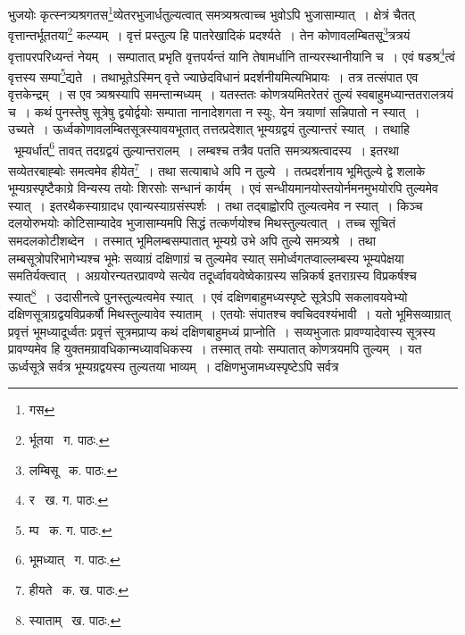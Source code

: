 \documentclass[11pt, openany]{book}
\begin{document}
\newpage
\noindent भुजयोः कृत्स्नत्र्यश्रगतस\renewcommand{\thefootnote}{१}\footnote{गस}व्येतरभुजार्धतुल्यत्वात् समत्र्यश्रत्वाच्च भुवोऽपि भुजासाम्यात्~। क्षेत्रं चैतत् वृत्तान्तर्भूततया\renewcommand{\thefootnote}{२}\footnote{र्भूतया \textendash\ ग. पाठः.} कल्प्यम्~। वृत्तं प्रस्तुत्य हि पातरेखादिकं प्रदर्श्यते~। तेन कोणावलम्बितसू\renewcommand{\thefootnote}{३}\footnote{लम्बिसू \textendash\ क. पाठः.}त्रत्रयं वृत्तापरपरिध्यन्तं नेयम्~। सम्पातात् प्रभृति वृत्तपर्यन्तं यानि तेषामर्धानि तान्यरस्थानीयानि च~। एवं षडश्र\renewcommand{\thefootnote}{४}\footnote{र \textendash\ ख. ग. पाठः.}त्वं वृत्तस्य सम्पा\renewcommand{\thefootnote}{५}\footnote{म्प \textendash\ क. ग. पाठः.}द्यते~। तथाभूतेऽस्मिन् वृत्ते ज्याछेदविधानं प्रदर्शनीयमित्यभिप्रायः~। तत्र तत्संपात एव वृत्तकेन्द्रम्~। स एव त्र्यश्रस्यापि समन्तान्मध्यम्~। यतस्ततः कोणत्रयमितरेतरं तुल्यं स्वबाहुमध्यान्ततरालत्रयं च~। कथं पुनस्तेषु सूत्रेषु द्वयोर्द्वयोः सम्पाता नानादेशगता न स्युः, येन त्रयाणां सन्निपातो न स्यात्~। उच्यते~। ऊर्ध्वकोणावलम्बितसूत्रस्यावयभूतात् तत्तत्प्रदेशात् भूम्यग्रद्वयं तुल्यान्तरं स्यात्~। तथाहि \textendash\ भूम्यर्धात्\renewcommand{\thefootnote}{६}\footnote{भूमध्यात् \textendash\ ग. पाठः.} तावत् तदग्रद्वयं तुल्यान्तरालम्~। लम्बश्च तत्रैव पतति समत्र्यश्रत्वादस्य~। इतरथा सव्येतरबाह्बोः समत्वमेव हीयेत\renewcommand{\thefootnote}{७}\footnote{हीयते \textendash\ क. ख. पाठः.}~। तथा सत्याबाधे अपि न तुल्ये~। तत्प्रदर्शनाय भूमितुल्ये द्वे शलाके भूम्यग्रस्पृष्टैकाग्रे विन्यस्य तयोः शिरसोः सन्धानं कार्यम्~। एवं सन्धीयमानयोस्तयोर्नमनमुभयोरपि तुल्यमेव स्यात्~। इतरथैकस्याग्रादध एवान्यस्याग्रसंस्पर्शः~। तथा तद्बाह्वोरपि तुल्यत्वमेव न स्यात्~। किञ्च दलयोरुभयोः कोटिसाम्यादेव भुजासाम्यमपि सिद्धं तत्कर्णयोश्च मिथस्तुल्यत्वात्~। तच्च सूचितं समदलकोटीशब्देन~। तस्मात् भूमिलम्बसम्पातात् भूम्यग्रे उभे अपि तुल्ये समत्र्यश्रे~। तथा लम्बसूत्रोपरिभागेभ्यश्च भूमेः सव्याग्रं दक्षिणाग्रं च तुल्यमेव स्यात् समोर्ध्वगतप्वाल्लम्बस्य भूम्यपेक्षया समतिर्यक्त्वात्~। अग्रयोरन्यतरप्रावण्ये सत्येव तदूर्ध्वावयवेष्वेकाग्रस्य सन्निकर्ष इतराग्रस्य विप्रकर्षश्च स्यात्\renewcommand{\thefootnote}{८}\footnote{स्याताम् \textendash\ ख. पाठः.}~। उदासीनत्वे पुनस्तुल्यत्वमेव स्यात्~। एवं दक्षिणबाहुमध्यस्पृष्टे सूत्रेऽपि सकलावयवेभ्यो दक्षिणसूत्राग्रद्वयविप्रकर्षौ मिथस्तुल्यावेव स्याताम्~। एतयोः संपातश्च क्वचिदवश्यंभावी~। यतो भूमिसव्याग्रात् प्रवृत्तं भूमध्यादूर्ध्वतः प्रवृत्तं सूत्रमप्राप्य कथं दक्षिणबाहुमध्यं प्राप्नोति~। सव्यभुजातः प्रावण्यादेवास्य सूत्रस्य प्रावण्यमेव हि युक्तमग्रावधिकान्मध्यावधिकस्य~। तस्मात् तयोः सम्पातात् कोणत्रयमपि तुल्यम्~। यत ऊर्ध्वसूत्रे सर्वत्र भूम्यग्रद्वयस्य तुल्यतया भाव्यम्~।
दक्षिणभुजामध्यस्पृष्टेऽपि सर्वत्र 
\end{document}
